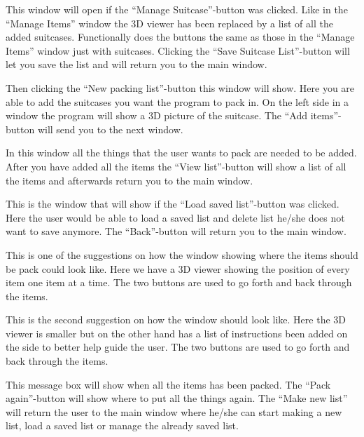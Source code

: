 
This window will open if the “Manage Suitcase”-button was clicked. Like in the “Manage Items” window the 3D viewer has been replaced by a list of all the added suitcases. Functionally does the buttons the same as those in the “Manage Items” window just with suitcases. Clicking the “Save Suitcase List”-button will let you save the list and will return you to the main window.


Then clicking the “New packing list”-button this window will show. Here you are able to add the suitcases you want the program to pack in. On the left side in a window the program will show a 3D picture of the suitcase. The “Add items”-button will send you to the next window.


In this window all the things that the user wants to pack are needed to be added. After you have added all the items the “View list”-button will show a list of all the items and afterwards return you to the main window.


This is the window that will show if the “Load saved list”-button was clicked. Here the user would be able to load a saved list and delete list he/she does not want to save anymore. The “Back”-button will return you to the main window.


This is one of the suggestions on how the window showing where the items should be pack could look like. Here we have a 3D viewer showing the position of every item one item at a time. The two buttons are used to go forth and back through the items.


This is the second suggestion on how the window should look like. Here the 3D viewer is smaller but on the other hand has a list of instructions been added on the side to better help guide the user. The two buttons are used to go forth and back through the items.


This message box will show when all the items has been packed. The “Pack again”-button will show where to put all the things again. The “Make new list” will return the user to the main window where he/she can start making a new list, load a saved list or manage the already saved list. 
